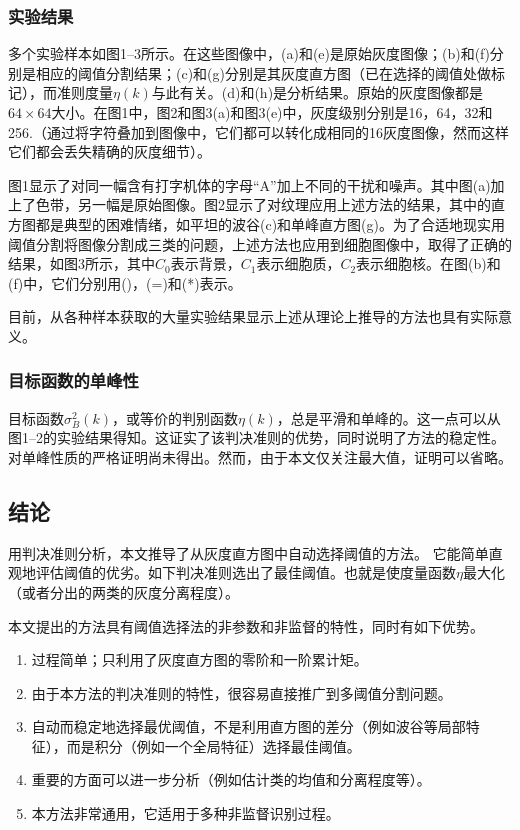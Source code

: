 \subsubsection*{实验结果}

多个实验样本如图1--3所示。在这些图像中，(a)和(e)是原始灰度图像；(b)和(f)分别是相应的阈值分割结果；(c)和(g)分别是其灰度直方图（已在选择的阈值处做标记），而准则度量$\eta(k)$与此有关。(d)和(h)是分析结果。原始的灰度图像都是$64\times 64$大小。在图1中，图2和图3(a)和图3(e)中，灰度级别分别是16，64，32和256.（通过将字符叠加到图像中，它们都可以转化成相同的16灰度图像，然而这样它们都会丢失精确的灰度细节）。

图1显示了对同一幅含有打字机体的字母“A”加上不同的干扰和噪声。其中图(a)加上了色带，另一幅是原始图像。图2显示了对纹理应用上述方法的结果，其中的直方图都是典型的困难情绪，如平坦的波谷(c)和单峰直方图(g)。为了合适地现实用阈值分割将图像分割成三类的问题，上述方法也应用到细胞图像中，取得了正确的结果，如图3所示，其中$C_0$表示背景，$C_1$表示细胞质，$C_2$表示细胞核。在图(b)和(f)中，它们分别用()，(=)和(*)表示。

目前，从各种样本获取的大量实验结果显示上述从理论上推导的方法也具有实际意义。

\subsubsection*{目标函数的单峰性}

目标函数$\sigma_B^2(k)$，或等价的判别函数$\eta(k)$，总是平滑和单峰的。这一点可以从图1--2的实验结果得知。这证实了该判决准则的优势，同时说明了方法的稳定性。对单峰性质的严格证明尚未得出。然而，由于本文仅关注最大值，证明可以省略。

\subsection*{结论}

用判决准则分析，本文推导了从灰度直方图中自动选择阈值的方法。 它能简单直观地评估阈值的优劣。如下判决准则选出了最佳阈值。也就是使度量函数$\eta$最大化（或者分出的两类的灰度分离程度）。

本文提出的方法具有阈值选择法的非参数和非监督的特性，同时有如下优势。
\begin{enumerate}[1)]
\item 过程简单；只利用了灰度直方图的零阶和一阶累计矩。
\item 由于本方法的判决准则的特性，很容易直接推广到多阈值分割问题。
\item 自动而稳定地选择最优阈值，不是利用直方图的差分（例如波谷等局部特征），而是积分（例如一个全局特征）选择最佳阈值。
\item 重要的方面可以进一步分析（例如估计类的均值和分离程度等）。
\item 本方法非常通用，它适用于多种非监督识别过程。
\end{enumerate}

